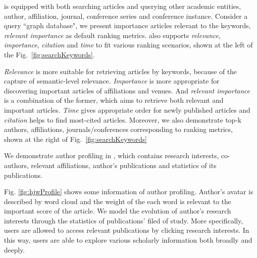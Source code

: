 

\oursystem is equipped with both searching articles and querying other academic entities, \ie author, affiliation, journal, conference series and conference instance. Consider a query ``graph database", we present importance articles relevant to the keywords, {\em relevant importance} as default ranking metrics. \oursystem also supports {\em relevance}, {\em importance}, {\em citation} and {\em time} to fit various ranking scenarios, shown at the left of the Fig.~\ref{fig:searchKeywords}.


\par
{\em Relevance} is more suitable for retrieving articles by keywords, because of the capture of  semantic-level relevance. {\em Importance} is more appropriate for discovering important articles of affiliations and venues. And {\em relevant importance} is a combination of the former, which aims to retrieve both relevant and important articles. {\em Time} gives appropriate order for newly published articles and {\em citation} helps to find most-cited articles. Moreover, we also demonstrate top-k authors, affiliations, journals/conferences corresponding to ranking metrics, shown at the right of Fig.~\ref{fig:searchKeywords}


 We demonstrate author profiling in \oursystem, which contains research interests, co-authors, relevant affiliations, author's publications and statistics of its publications.


\par
Fig. \ref{fig:hjwProfile} shows some information of author profiling. Author's avatar is described by word cloud and the weight of the each word is relevant to the important score of the article. We model the evolution of author's research interests through the statistics of publications' filed of study. More specifically, users are allowed to access relevant publications by clicking research interests. In this way, users are able to explore various scholarly information both broadly and deeply.

